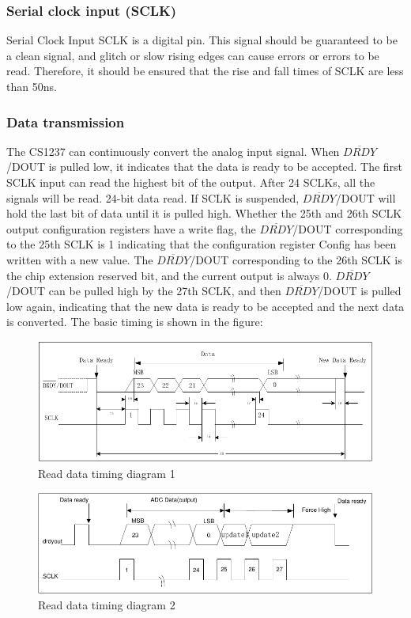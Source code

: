 \documentclass{article}
\begin{document}
\subsubsection{Serial clock input (SCLK)}

Serial Clock Input SCLK is a digital pin.
This signal should be guaranteed to be a clean signal, and glitch or slow rising edges can cause errors or errors to be read.
Therefore, it should be ensured that the rise and fall times of SCLK are less than 50ns.

\subsubsection{Data transmission}

The CS1237 can continuously convert the analog input signal. When $\overline{DRDY}$ /DOUT is pulled low, it indicates that the data is ready to be accepted. 
The first SCLK input can read the highest bit of the output. 
After 24 SCLKs, all the signals will be read. 24-bit data read. 
If SCLK is suspended, $\overline{DRDY}$/DOUT will hold the last bit of data until it is pulled high.
Whether the 25th and 26th SCLK output configuration registers have a write flag, the $\overline{DRDY}$/DOUT corresponding to the 25th SCLK is 1 indicating that the configuration register Config has been written with a new value.
The $\overline{DRDY}$/DOUT corresponding to the 26th SCLK is the chip extension reserved bit, and the current output is always 0.
$\overline{DRDY}$/DOUT can be pulled high by the 27th SCLK, and then $\overline{DRDY}$/DOUT is pulled low again, indicating that the new data is ready to be accepted and the next data is converted.
The basic timing is shown in the figure:

\begin{figure}[h]
    \centering
    \includegraphics[width=1\textwidth]{fig7.png}
    \caption{Read data timing diagram 1}
    \label{fig:fig7}
\end{figure}

\begin{figure}[h]
    \centering
    \includegraphics[width=1\textwidth]{fig8.png}
    \caption{Read data timing diagram 2}
    \label{fig:fig8}
\end{figure}
\end{document}

